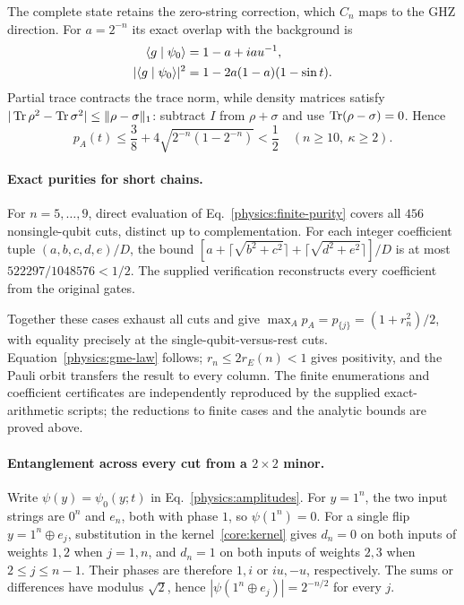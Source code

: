 The complete state retains the zero-string correction, which $C_n$ maps to the GHZ direction. For $a=2^{-n}$ its exact overlap with the background is
\begin{equation}
 \begin{aligned}
 \langle g\mid \psi_0\rangle&=1-a+iau^{-1},\\
 |\langle g\mid \psi_0\rangle|^2&=1-2a(1-a)(1-\sin t).
 \end{aligned}
 \label{physics:background-overlap}
\end{equation}
Partial trace contracts the trace norm, while density matrices satisfy $|\operatorname{Tr}\rho^2-\operatorname{Tr}\sigma^2|\le\|\rho-\sigma\|_1$: subtract $I$ from $\rho+\sigma$ and use $\operatorname{Tr}(\rho-\sigma)=0$. Hence
\begin{equation}
 p_A(t)\le\frac38+4\sqrt{2^{-n}(1-2^{-n})}<\frac12
 \quad(n\ge10,\ \kappa\ge2).
 \label{physics:complete-purity-bound}
\end{equation}

\paragraph*{Exact purities for short chains.}
For $n=5,\ldots,9$, direct evaluation of Eq.~\eqref{physics:finite-purity} covers all $456$ nonsingle-qubit cuts, distinct up to complementation. For each integer coefficient tuple $(a,b,c,d,e)/D$, the bound $[a+\lceil\sqrt{b^2+c^2}\rceil+\lceil\sqrt{d^2+e^2}\rceil]/D$ is at most $522297/1048576<1/2$. The supplied verification reconstructs every coefficient from the original gates.

Together these cases exhaust all cuts and give $\max_Ap_A=p_{\{j\}}=(1+r_n^2)/2$, with equality precisely at the single-qubit-versus-rest cuts. Equation~\eqref{physics:gme-law} follows; $r_n\le2r_E(n)<1$ gives positivity, and the Pauli orbit transfers the result to every column. The finite enumerations and coefficient certificates are independently reproduced by the supplied exact-arithmetic scripts; the reductions to finite cases and the analytic bounds are proved above.

\paragraph*{Entanglement across every cut from a $2\times2$ minor.}
Write $\psi(y)=\psi_0(y;t)$ in Eq.~\eqref{physics:amplitudes}. For $y=1^n$, the two input strings are $0^n$ and $e_n$, both with phase $1$, so $\psi(1^n)=0$. For a single flip $y=1^n\oplus e_j$, substitution in the kernel~\eqref{core:kernel} gives $d_n=0$ on both inputs of weights $1,2$ when $j=1,n$, and $d_n=1$ on both inputs of weights $2,3$ when $2\le j\le n-1$. Their phases are therefore $1,i$ or $iu,-u$, respectively. The sums or differences have modulus $\sqrt2$, hence $|\psi(1^n\oplus e_j)|=2^{-n/2}$ for every $j$.

